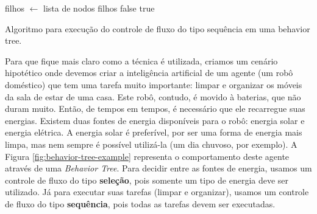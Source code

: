 \begin{algorithm}[H]
\begin{center}
	\begin{algorithmic}[1]
        \STATE filhos $\gets$ lista de nodos filhos
                \RETURN false
            \ENDIF
        \ENDFOR
        \RETURN true
    \end{algorithmic}
\end{center}
\caption[Algoritmo para execução do controle de fluxo do tipo sequência em uma
behavior tree.]
{\label{alg:behavior-tree-sequence} Algoritmo para execução do controle de fluxo
do tipo sequência em uma behavior tree.}
\end{algorithm}

Para que fique mais claro como a técnica é utilizada, criamos um cenário
hipotético onde devemos criar a inteligência artificial de um agente (um robô
doméstico) que tem uma tarefa muito importante: limpar e organizar os móveis da
sala de estar de uma casa. Este robô, contudo, é movido à baterias, que não
duram muito. Então, de tempos em tempos, é necessário que ele recarregue suas
energias. Existem duas fontes de energia disponíveis para o robô: energia solar
e energia elétrica. A energia solar é preferível, por ser uma forma de energia
mais limpa, mas nem sempre é possível utilizá-la (um dia chuvoso, por exemplo).
A Figura \ref{fig:behavior-tree-example} representa o comportamento deste agente
através de uma \textit{Behavior Tree}. Para decidir entre as fontes de energia,
usamos um controle de fluxo do tipo \textbf{seleção}, pois somente um tipo de
energia deve ser utilizado. Já para executar suas tarefas (limpar e organizar),
usamos um controle de fluxo do tipo \textbf{sequência}, pois todas as tarefas
devem ser executadas.

